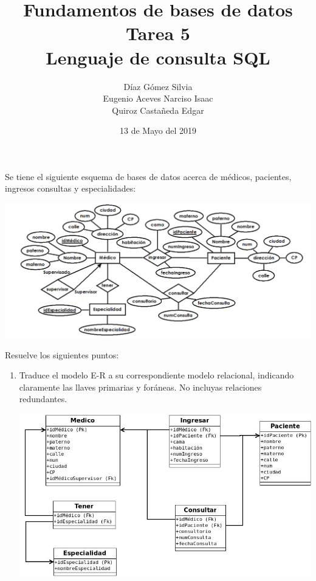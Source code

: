 \documentclass{article}
\begin{document}
    \title{
        Fundamentos de bases de datos \\
        Tarea 5 \\
        Lenguaje de consulta SQL
    }
    \author{
        Díaz Gómez Silvia \\
        Eugenio Aceves Narciso Isaac \\
        Quiroz Castañeda Edgar
    }
    \date {
        13 de Mayo del 2019    
    }
    \maketitle
    Se tiene el siguiente esquema de bases de datos acerca de médicos, pacientes, ingresos consultas y
    especialidades:\\
    
   \begin{center}
   	\includegraphics[width=1\textwidth]{img.JPG}
   \end{center}
    
    Resuelve los siguientes puntos:
    \begin{enumerate}
    	\item Traduce el modelo E-R a su correspondiente modelo relacional, indicando claramente las llaves
    	primarias y foráneas. No incluyas relaciones redundantes.\\
    	
    	\begin{center}
    		\includegraphics[width=1\textwidth]{DiagramaRelacional.jpeg}
    	\end{center}
   \end{enumerate}
\end{document}
